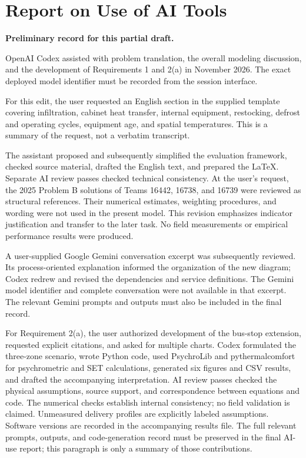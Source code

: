 \documentclass[12pt]{article}
\begin{document}
\section*{Report on Use of AI Tools}
\noindent\textbf{Preliminary record for this partial draft.}

OpenAI Codex assisted with problem translation, the overall modeling discussion,
and the development of Requirements 1 and 2(a) in November 2026. The exact deployed model
identifier must be recorded from the session interface.

For this edit, the user requested an English section in the supplied template
covering infiltration, cabinet heat transfer, internal equipment, restocking,
defrost and operating cycles, equipment age, and spatial temperatures. This is
a summary of the request, not a verbatim transcript.

The assistant proposed and subsequently simplified the evaluation framework,
checked source material, drafted the English text, and prepared the LaTeX.
Separate AI review passes checked technical consistency. At the user's request,
the 2025 Problem B solutions of Teams 16442, 16738, and 16739 were reviewed as
structural references. Their numerical estimates, weighting procedures, and
wording were not used in the present model. This revision emphasizes indicator
justification and transfer to the later task. No field measurements or empirical
performance results were produced.

A user-supplied Google Gemini conversation excerpt was subsequently reviewed.
Its process-oriented explanation informed the organization of the new diagram;
Codex redrew and revised the dependencies and service definitions. The Gemini
model identifier and complete conversation were not available in that excerpt.
The relevant Gemini prompts and outputs must also be included in the final record.

For Requirement 2(a), the user authorized development of the bus-stop extension,
requested explicit citations, and asked for multiple charts. Codex formulated the
three-zone scenario, wrote Python code, used PsychroLib and pythermalcomfort for
psychrometric and SET calculations, generated six figures and CSV results, and
drafted the accompanying interpretation. AI review passes checked the physical
assumptions, source support, and correspondence between equations and code.
The numerical checks establish internal consistency; no field validation is
claimed. Unmeasured delivery profiles are explicitly labeled assumptions.
Software versions are recorded in the accompanying results file. The full
relevant prompts, outputs, and code-generation record must be preserved in the
final AI-use report; this paragraph is only a summary of those contributions.
\end{document}
